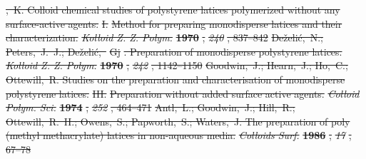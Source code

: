 \documentclass[journal=langd5,manuscript=article]{achemso}
\providecommand{\DIFdel}[1]{{\protect\color{red}\sout{#1}}}                      %
\begin{document}
\DIFdel{,~K. Colloid chemical studies of polystyrene
  latices polymerized without any surface-active agents. }%
\DIFdel{I.}%
\DIFdel{Method for
  preparing monodisperse latices and their characterization. }\emph{\DIFdel{Kolloid Z.
  Z. Polym.}} %
\textbf{\DIFdel{1970}}%
\DIFdel{, }\emph{\DIFdel{240}}%
\DIFdel{, 837--842}%
\DIFdel{De\v{z}eli\'{c},~N.; Peters,~J.~J.; De\v{z}eli\'{c},~}%
\DIFdel{Gj}%
\DIFdel{. Preparation
  of monodisperse polystyrene latices. }\emph{\DIFdel{Kolloid Z. Z. Polym.}}
\textbf{\DIFdel{1970}}%
\DIFdel{, }\emph{\DIFdel{242}}%
\DIFdel{, 1142--1150}%
\DIFdel{Goodwin,~J.; Hearn,~J.; Ho,~C.; Ottewill,~R. Studies on the preparation and
  characterisation of monodisperse polystyrene latices. }%
\DIFdel{III.}%
\DIFdel{Preparation
  without added surface active agents. }\emph{\DIFdel{Colloid Polym. Sci.}}
\textbf{\DIFdel{1974}}%
\DIFdel{, }\emph{\DIFdel{252}}%
\DIFdel{, 464--471}%
\DIFdel{Antl,~L.; Goodwin,~J.; Hill,~R.; Ottewill,~R.~H.; Owens,~S.; Papworth,~S.;
  Waters,~J. The preparation of poly (methyl methacrylate) latices in
  non-aqueous media. }\emph{\DIFdel{Colloids Surf.}} %
\textbf{\DIFdel{1986}}%
\DIFdel{, }\emph{\DIFdel{17}}%
\DIFdel{,
  67--78}%
\end{document}
